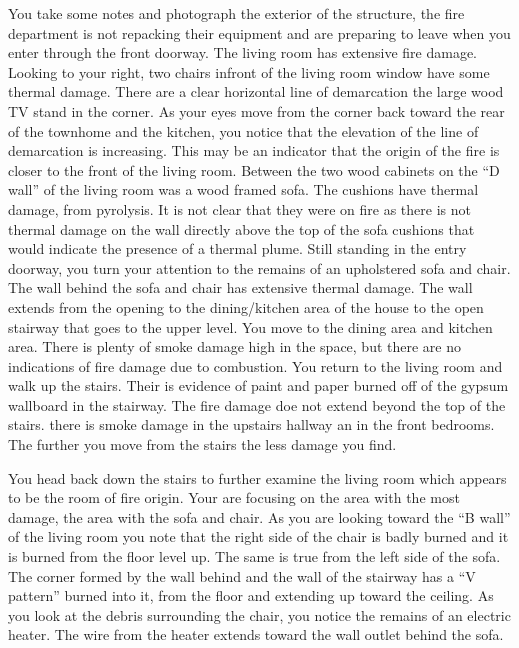 \documentclass[twoside]{uocthesis}
\begin{document}
{You take some notes and photograph the exterior of the structure, the fire department is not repacking their equipment and are preparing to leave when you enter through the front doorway.  The living room has extensive fire damage.  Looking to your right, two chairs infront of the living room window have some thermal damage.  There are a clear horizontal line of demarcation the large wood TV stand in the corner.  As your eyes move from the corner back toward the rear of the townhome and the kitchen, you notice that the elevation of the line of demarcation is increasing.  This may be an indicator that the origin of the fire is closer to the front of the living room.  Between the two wood cabinets on the ``D wall'' of the living room was a wood framed sofa.  The cushions have thermal damage, from pyrolysis.  It is not clear that they were on fire as there is not thermal damage on the wall directly above the top of the sofa cushions that would indicate the presence of a thermal plume.  Still standing in the entry doorway, you turn your attention to the remains of an upholstered sofa and chair.  The wall behind the sofa and chair has extensive thermal damage.  The wall extends from the opening to the dining/kitchen area of the house to the open stairway that goes to the upper level.  You move to the dining area and kitchen area.  There is plenty of smoke damage high in the space, but there are no indications of fire damage due to combustion.  You return to the living room and walk up the stairs.  Their is evidence of paint and paper burned off of the gypsum wallboard in the stairway.  The fire damage doe not extend beyond the top of the stairs.  there is smoke damage in the upstairs hallway an in the front bedrooms. The further you move from the stairs the less damage you find.  

You head back down the stairs to further examine the living room which appears to be the room of fire origin. Your are focusing on the area with the most damage, the area with the sofa and chair.  As you are looking toward the ``B wall'' of the living room you note that the right side of the chair is badly burned and it is burned from the floor level up.  The same is true from the left side of the sofa.  The corner formed by the wall behind and the wall of the stairway has a ``V pattern'' burned into it, from the floor and extending up toward the ceiling.  As you look at the debris surrounding the chair, you notice the remains of an electric heater.  The wire from the heater extends toward the wall outlet behind the sofa.

}
\end{document}
